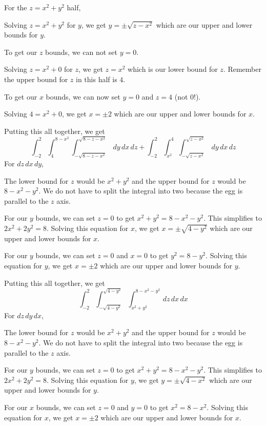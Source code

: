 \documentclass{article}
\begin{document}
For the $z=x^2+y^2$ half,

Solving $z=x^2+y^2$ for $y$, we get $y=\pm\sqrt{z-x^2}$ which are our upper and lower bounds for $y$.

To get our $z$ bounds, we can not set $y=0$.

Solving $z=x^2+0$ for $z$, we get $z=x^2$ which is our lower bound for $z$. Remember the upper bound for $z$ in this half is $4$.

To get our $x$ bounds, we can now set $y=0$ and $z=4$ (not $0$!).

Solving $4=x^2+0$, we get $x=\pm 2$ which are our upper and lower bounds for $x$.

Putting this all together, we get
\begin{equation*}
   \int_{-2}^2\int_4^{8-x^2}\int_{-\sqrt{8-z-x^2}}^{\sqrt{8-z-x^2}}\,dy\,dx\,dz+\int_{-2}^2\int_{x^2}^4\int_{-\sqrt{z-x^2}}^{\sqrt{z-x^2}}\,dy\,dx\,dz
\end{equation*}
For $dz\,dx\,dy$,

The lower bound for $z$ would be $x^2+y^2$ and the upper bound for $z$ would be $8-x^2-y^2$. We do not have to split the integral into two because the egg is parallel to the $z$ axis.

For our $y$ bounds, we can set $z=0$ to get $x^2+y^2=8-x^2-y^2$. This simplifies to $2x^2+2y^2=8$. Solving this equation for $x$, we get $x=\pm\sqrt{4-y^2}$ which are our upper and lower bounds for $x$.

For our $y$ bounds, we can set $z=0$ and $x=0$ to get $y^2=8-y^2$. Solving this equation for $y$, we get $x=\pm 2$ which are our upper and lower bounds for $y$.

Putting this all together, we get
\begin{equation*}
    \int_{-2}^2\int_{-\sqrt{4-y^2}}^{\sqrt{4-y^2}}\int_{x^2+y^2}^{8-x^2-y^2}\,dz\,dx\,dx
\end{equation*}
For $dz\,dy\,dx$,

The lower bound for $z$ would be $x^2+y^2$ and the upper bound for $z$ would be $8-x^2-y^2$. We do not have to split the integral into two because the egg is parallel to the $z$ axis.

For our $y$ bounds, we can set $z=0$ to get $x^2+y^2=8-x^2-y^2$. This simplifies to $2x^2+2y^2=8$. Solving this equation for $y$, we get $y=\pm\sqrt{4-x^2}$ which are our upper and lower bounds for $y$.

For our $x$ bounds, we can set $z=0$ and $y=0$ to get $x^2=8-x^2$. Solving this equation for $x$, we get $x=\pm 2$ which are our upper and lower bounds for $x$.
\end{document}
